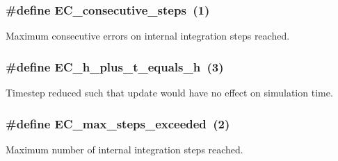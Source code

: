 \subsubsection[{\texorpdfstring{E\+C\+\_\+consecutive\+\_\+steps}{EC_consecutive_steps}}]{\setlength{\rightskip}{0pt plus 5cm}\#define E\+C\+\_\+consecutive\+\_\+steps~(1)}\hypertarget{group__exprb43cu__ErrCodes_gae0287841c08f86f5709660fd731615ad}{}\label{group__exprb43cu__ErrCodes_gae0287841c08f86f5709660fd731615ad}


Maximum consecutive errors on internal integration steps reached. 

\subsubsection[{\texorpdfstring{E\+C\+\_\+h\+\_\+plus\+\_\+t\+\_\+equals\+\_\+h}{EC_h_plus_t_equals_h}}]{\setlength{\rightskip}{0pt plus 5cm}\#define E\+C\+\_\+h\+\_\+plus\+\_\+t\+\_\+equals\+\_\+h~(3)}\hypertarget{group__exprb43cu__ErrCodes_ga9326efd544880e2683c4453365ca2704}{}\label{group__exprb43cu__ErrCodes_ga9326efd544880e2683c4453365ca2704}


Timestep reduced such that update would have no effect on simulation time. 

\subsubsection[{\texorpdfstring{E\+C\+\_\+max\+\_\+steps\+\_\+exceeded}{EC_max_steps_exceeded}}]{\setlength{\rightskip}{0pt plus 5cm}\#define E\+C\+\_\+max\+\_\+steps\+\_\+exceeded~(2)}\hypertarget{group__exprb43cu__ErrCodes_ga0f0275d9851ab5c19b79a963d5084df3}{}\label{group__exprb43cu__ErrCodes_ga0f0275d9851ab5c19b79a963d5084df3}


Maximum number of internal integration steps reached. 

